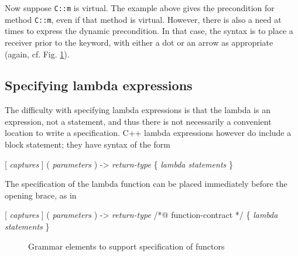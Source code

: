 Now suppose \lstinline|C::m| is virtual. The example above gives the precondition for method \lstinline|C::m|, even if that method is virtual. However, there is also a need at times to express the dynamic precondition. In that case, the syntax is to place a receiver prior to the keyword, with either a dot or an arrow as appropriate (again, cf. Fig. \ref{fig:gram:functional}).


\subsection{Specifying lambda expressions}

The difficulty with specifying lambda expressions is that the lambda is an expression, not a statement, and thus there is not necessarily a convenient location to write a specification.
C++ lambda expressions however do include a block statement; they have syntax of the form\\
\centerline{ [ \textit{captures} ] ( \textit{parameters} ) -> \textit{return-type}  \{ \textit{lambda statements} \} }
The specification of the lambda function can be placed immediately before the opening brace, as in \\
\centerline{ [ \textit{captures} ] ( \textit{parameters} ) -> \textit{return-type} /*@ function-contract */ \{ \textit{lambda statements} \} }

\begin{figure}
\begin{cadre}

\end{cadre}
\caption{Grammar elements to support specification of functors}
\label{fig:gram:functional}
\end{figure}
